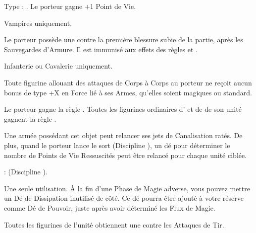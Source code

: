  Type : \platearmour{}. Le porteur gagne +1 Point de Vie.

\endpricelist

\armytalismans

\startpricelist

 Vampires uniquement.

Le porteur possède une  contre la première blessure subie de la partie, après les Sauvegardes d'Armure. Il est immunisé aux effets des règles  et \multiplewounds{}{}.

 Infanterie ou Cavalerie uniquement.

Toute figurine allouant des attaques de Corps à Corps au porteur ne reçoit aucun bonus de type +X en Force lié à ses Armes, qu'elles soient magiques ou standard.

\endpricelist

\armyenchanteditems

\startpricelist

 Le porteur gagne la règle \distracting{}. Toutes les figurines ordinaires d'\infantry{} et de \cavalry{} de son unité gagnent la règle \parry{}.

\endpricelist

\armyarcaneitems

\startpricelist

 Une armée possédant cet objet peut relancer ses jets de Canalisation ratés. De plus, quand le porteur lance le sort \necromancysignaturespell{} (Discipline \necromancy{}), un dé pour déterminer le nombre de Points de Vie Ressuscités peut être relancé pour chaque unité ciblée.

  : \necromancyspelltwo{} (Discipline \necromancy{}).

 Une seule utilisation. À la fin d'une Phase de Magie adverse, vous pouvez mettre un Dé de Dissipation inutilisé de côté. Ce dé pourra être ajouté à votre réserve comme Dé de Pouvoir, juste après avoir déterminé les Flux de Magie.

\endpricelist

\armymagicalbanners

\startpricelist

 Toutes les figurines de l'unité obtiennent une  contre les Attaques de Tir. 

